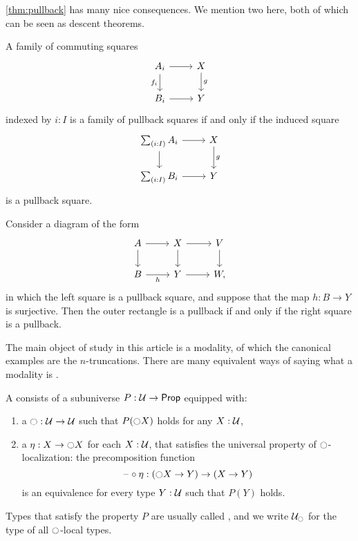 \documentclass[9pt,twosided]{amsart}
\begin{document}
\cref{thm:pullback} has many nice consequences. We mention two here, both of which can be seen as descent theorems.

\begin{thm}\label{thm:descent-sigma}
  A family of commuting squares
\begin{equation*}
  \begin{tikzcd}
    A_i \arrow[d,swap,"f_i"] \arrow[r] & X \arrow[d,"g"] \\
    B_i \arrow[r] & Y
  \end{tikzcd}
\end{equation*}
indexed by $i:I$ is a family of pullback squares if and only if the induced square
\begin{equation*}
  \begin{tikzcd}
    \sm{i:I}A_i \arrow[d] \arrow[r] & X \arrow[d,"g"] \\
    \sm{i:I}B_i \arrow[r] & Y
  \end{tikzcd}
\end{equation*}
is a pullback square.
\end{thm}

\begin{thm}\label{thm:descent-surjective}
  Consider a diagram of the form
  \begin{equation*}
    \begin{tikzcd}
      A \arrow[d] \arrow[r] & X \arrow[d] \arrow[r] & V \arrow[d] \\
      B \arrow[r,swap,"h"] & Y \arrow[r] & W,
    \end{tikzcd}
  \end{equation*}
  in which the left square is a pullback square, and suppose that the map $h:B\to Y$ is surjective. Then the outer rectangle is a pullback if and only if the right square is a pullback.
\end{thm}

The main object of study in this article is a modality, of which the canonical examples are the $n$-truncations. There are many equivalent ways of saying what a modality is \cite{RijkeSpittersShulman}.

\begin{defn}
  A  consists of a subuniverse $P:\mathcal{U}\to\mathsf{Prop}$ equipped with:
  \begin{enumerate}
  \item a  ${\ocircle} :\mathcal{U}\to\mathcal{U}$ such that $P({\ocircle} X)$ holds for any $X:\mathcal{U}$,
  \item a  $\eta:X\to{\ensuremath{\ocircle}} X$ for each $X:\mathcal{U}$, that satisfies the universal property of ${\ocircle}$-localization: the precomposition function
    \begin{equation*}
      \mathord{\hspace{1pt}\text{--}\hspace{1pt}}\circ\eta : ({\ocircle} X\to Y)\to (X\to Y)
    \end{equation*}
    is an equivalence for every type $Y:\mathcal{U}$ such that $P(Y)$ holds.
  \end{enumerate}
  Types that satisfy the property $P$ are usually called , and we write $\mathcal{U}_{\ocircle}$ for the type of all ${\ocircle}$-local types.
\end{defn}
\end{document}
